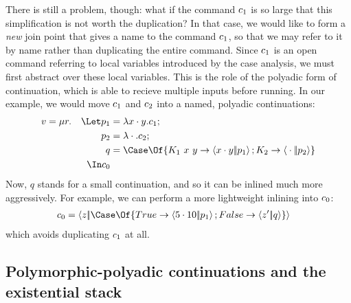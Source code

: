 \documentclass{article}
\begin{document}
There is still a problem, though: what if the command $c_1$ is so large that
this simplification is not worth the duplication?  In that case, we would like
to form a \emph{new} join point that gives a name to the command $c_1$, so
that we may refer to it by name rather than duplicating the entire command.
Since $c_1$ is an open command referring to local variables introduced by the
case analysis, we must first abstract over these local variables.  This is the
role of the polyadic form of continuation, which is able to recieve multiple
inputs before running.  In our example, we would move $c_1$ and $c_2$ into
a named, polyadic continuations:
\begin{gather*}
\begin{aligned}
  v
  &=
  \comp{r}
  &
    \Let
      p_1 &= \fnk{\pack{x}{y}} \com_1;
  \\
  &&
      p_2 &= \fnk{\packs{}{}} \com_2;
  \\
  &&
      q &= \Case\Of \{
          K_1 ~ x ~ y \to \cut{\pack{x}{y}}{p_1};
          K_2 \to \cut{\packs{}{}}{p_2}
          \}
  \\
  &&
    \In
    \com_0
\end{aligned}
\end{gather*}
Now, $q$ stands for a small continuation, and so it can be inlined much more
aggressively.  For example, we can perform a more lightweight inlining into
$c_0$:
\begin{align*}
  \com_0
  &=
  \cut{z}{\Case\Of \{ True \to \cut{\pack{5}{10}}{p_1}; False \to \cut{z'}{q} \}}
\end{align*}
which avoids duplicating $c_1$ at all.

\subsection{Polymorphic-polyadic continuations and the existential stack}
\end{document}
